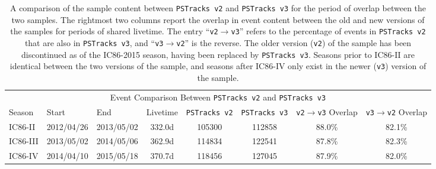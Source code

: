 \documentclass[aps,10pt,prd,twocolumn,floats,letterpaper,showpacs,nofootinbib,bibnotes,notitlepage,superscriptaddress,floatfix]{revtex4-1}
\newcommand{\MA}[1]{{\color{magenta}#1}}
\begin{document}
\begin{table}[p]
\centering
\begin{ruledtabular}
\begin{tabular}{lllccccc}
\multicolumn{8}{c}{Event Comparison Between \MA{\tt PSTracks~v2} and \MA{\tt PSTracks~v3}} \\[0.1cm]
Season & Start & End & Livetime & \MA{\tt PSTracks v2} & \MA{\tt PSTracks v3} & {\tt v2}$\rightarrow${\tt v3} Overlap & {\tt v3}$\rightarrow${\tt v2} Overlap \\ 
IC86-II & 2012/04/26\footnotemark & 2013/05/02 & 332.0d & 105300 & 112858 & 88.0\% & 82.1\% \\
IC86-III & 2013/05/02 & 2014/05/06 & 362.9d & 114834 & 122541 & 87.8\% & 82.3\% \\
IC86-IV & 2014/04/10\footnotemark & 2015/05/18 & 370.7d & 118456 & 127045 & 87.9\% & 82.0\% \\
\end{tabular}
\end{ruledtabular}
\caption[]{A comparison of the sample content between \MA{\tt PSTracks v2} and \MA{\tt PSTracks v3} for the period of overlap between the two samples. The rightmost two columns report the overlap in event content between the old and new versions of the samples for periods of shared livetime. \MA{The entry ``{\tt v2}$\rightarrow${\tt v3}''} refers to the percentage of events in {\tt PSTracks v2} that are also in \MA{\tt PSTracks v3}, and \MA{``{\tt v3}$\rightarrow${\tt v2}''} is the reverse. The \MA{older} version ({\tt v2}) of the sample has been discontinued as of the IC86-2015 season, having been replaced by \MA{\tt PSTracks v3}. Seasons prior to IC86-II are identical between the two versions of the sample, and seasons after IC86-IV only exist in the \MA{newer} ({\tt v3}) version of the sample.}\label{tab:v2v3evtcontent}
\end{table}
\end{document}
